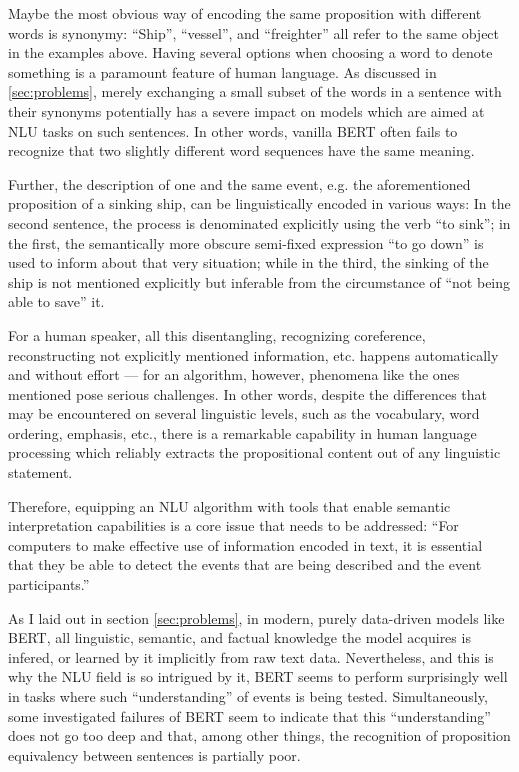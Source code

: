 Maybe the most obvious way of encoding the same proposition with different words is synonymy:
``Ship'', ``vessel'', and ``freighter'' all refer to the same object in the examples above. Having
several options when choosing a word to denote something is a paramount feature of human language.
As discussed in \ref{sec:problems}, merely exchanging a small subset of the words in a sentence
with their synonyms potentially has a severe impact on models which are aimed at NLU tasks on such
sentences. In other words, vanilla BERT often fails to recognize that two slightly different word
sequences have the same meaning.

Further, the description of one and the same event, e.g. the aforementioned proposition of a
sinking ship, can be linguistically encoded in various ways: In the second sentence, the process
is denominated explicitly using the verb ``to sink''; in the first, the semantically more obscure
semi-fixed expression ``to go down'' is used to inform about that very situation; while in the
third, the sinking of the ship is not mentioned explicitly but inferable from the circumstance of
``not being able to save'' it.

For a human speaker, all this disentangling, recognizing coreference, reconstructing not
explicitly mentioned information, etc. happens automatically and without effort --- for an
algorithm, however, phenomena like the ones mentioned pose serious challenges. In other
words, despite the differences that may be encountered on several linguistic levels, such
as the vocabulary, word ordering, emphasis, etc., there is a remarkable capability in human
language processing which reliably extracts the propositional content out of any linguistic
statement.

Therefore, equipping an NLU algorithm with tools that enable semantic interpretation capabilities
is a core issue that needs to be addressed: ``For computers to make effective use of information
encoded in text, it is essential that they be able to detect the events that are being described
and the event participants.'' \citep{palmer2010semantic}

As I laid out in section \ref{sec:problems}, in modern, purely data-driven models like BERT,
all linguistic, semantic, and factual knowledge the model acquires is infered, or learned by
it implicitly from raw text data. Nevertheless, and this is why the NLU field is so intrigued
by it, BERT seems to perform surprisingly well in tasks where such ``understanding'' of events
is being tested. Simultaneously, some investigated failures of BERT
seem to indicate that this ``understanding'' does not go too deep and that, among other things,
the recognition of proposition equivalency between sentences is partially poor.

